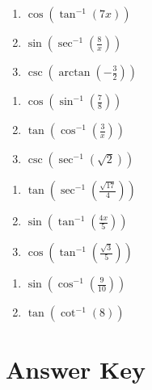 \smallskip
\begin{multicols}{3}
\begin{enumerate}	\setcounter{enumi}{\value{Review}}
	\item $\cos\left(\tan^{-1}(7x)\right)$
	\item $\sin\left(\sec^{-1}\left(\frac{8}{x}\right)\right)$
	\item $\csc\left(\arctan\left(-\frac{3}{2}\right)\right)$
\end{enumerate}	\setcounter{Review}{\value{enumi}}
\end{multicols}
\smallskip
\begin{multicols}{3}
\begin{enumerate}	\setcounter{enumi}{\value{Review}}
	\item $\cos\left(\sin^{-1}\left(\frac{7}{8}\right)\right)$
	\item $\tan\left(\cos^{-1}\left(\frac{3}{x}\right)\right)$
	\item $\csc\left(\sec^{-1}\left(\sqrt{2}\right)\right)$
\end{enumerate}	\setcounter{Review}{\value{enumi}}
\end{multicols}
\smallskip
\begin{multicols}{3}
\begin{enumerate}	\setcounter{enumi}{\value{Review}}
	\item $\tan\left(\sec^{-1}\left(\frac{\sqrt{17}}{4}\right)\right)$
	\item $\sin\left(\tan^{-1}\left(\frac{4x}{5}\right)\right)$
	\item $\cos\left(\tan^{-1}\left(\frac{\sqrt{3}}{5}\right)\right)$
\end{enumerate}	\setcounter{Review}{\value{enumi}}
\end{multicols}
\smallskip
\begin{multicols}{3}
\begin{enumerate}	\setcounter{enumi}{\value{Review}}
	\item $\sin\left(\cos^{-1}\left(\frac{9}{10}\right)\right)$
	\item $\tan\left(\cot^{-1}\left(8\right)\right)$
\end{enumerate}	\setcounter{Review}{\value{enumi}}
\end{multicols}
\smallskip
\newpage

\section{Answer Key}

